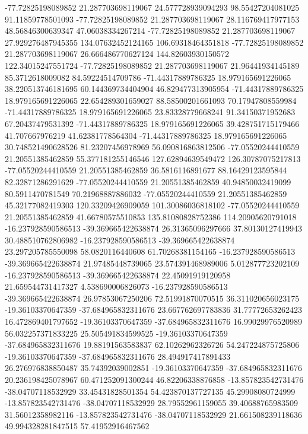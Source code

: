 -77.72825198089852 21.287703698119067 24.577728939094293 98.55427204081025 91.11859778501093
-77.72825198089852 21.287703698119067 28.116769417977153 48.56846300639347 47.06038334267214
-77.72825198089852 21.287703698119067 27.929276487945355 134.07632452124165 106.69318464351818
-77.72825198089852 21.287703698119067 26.666486770627124 144.82603930150572 122.34015247551724
-77.72825198089852 21.287703698119067 21.96441934145189 85.3712618009082 84.59224514709786
-71.44317889786325 18.979165691226065 38.220513746181695 60.144369734404904 46.829477313905954
-71.44317889786325 18.979165691226065 22.654289301659027 88.58500201661093 70.17947808559984
-71.44317889786325 18.979165691226065 23.83328779668241 91.34150371952683 67.20437479531392
-71.44317889786325 18.979165691226065 39.428751715179466 41.707667976219 41.62381778564304
-71.44317889786325 18.979165691226065 30.748521490628526 81.23207456978969 56.090816863812506
-77.05520244410559 21.20551385462859 55.377181255146546 127.62894639549472 126.30787075217813
-77.05520244410559 21.20551385462859 36.5816116891677 88.16429123595844 82.32871286291629
-77.05520244410559 21.20551385462859 40.94850032419099 80.5911470781549 70.21968887886032
-77.05520244410559 21.20551385462859 45.32177082419303 120.33209426909059 101.30086036818102
-77.05520244410559 21.20551385462859 41.66780575510853 135.81080828752386 114.20905620791018
-16.237928590586513 -39.369665422638874 26.31365096297666 37.80130127419943 30.488510762806982
-16.237928590586513 -39.369665422638874 23.297205785550098 58.0820116440608 61.70268381154165
-16.237928590586513 -39.369665422638874 21.97485448739065 23.574391468989006 5.012877723202109
-16.237928590586513 -39.369665422638874 22.45091919120958 21.659544731417327 4.538690006826073
-16.237928590586513 -39.369665422638874 26.97853067250206 72.51991870070515 36.311020656023175
-19.36103370647359 -37.684965832311676 23.667762697783836 31.77772653262423 16.472869401797652
-19.36103370647359 -37.684965832311676 16.99029976520989 56.032257371833225 25.505491834599525
-19.36103370647359 -37.684965832311676 19.88191563583837 62.10262962326726 54.247224875725806
-19.36103370647359 -37.684965832311676 28.494917417891433 26.276976838850487 35.74392039002851
-19.36103370647359 -37.684965832311676 20.236198425078967 60.471252091300244 46.82206338876858
-13.857823542731476 -38.04707118532929 33.45431828501354 54.423870137727135 45.29908080724999
-13.857823542731476 -38.04707118532929 28.79552961159055 39.40688765983509 31.56012358982116
-13.857823542731476 -38.04707118532929 21.661508239118636 49.994328281847515 57.41952916467562
